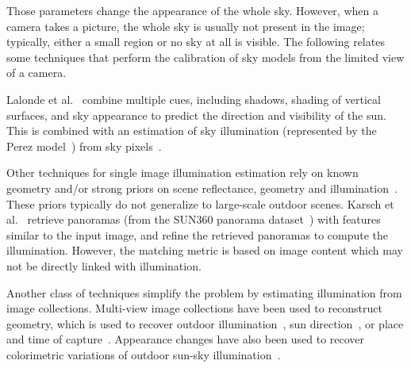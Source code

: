 Those parameters change the appearance of the whole sky. However, when a camera takes a picture, the whole sky is usually not present in the image; typically, either a small region or no sky at all is visible. The following relates some techniques that perform the calibration of sky models from the limited view of a camera. 

Lalonde et al.~\cite{lalonde-ijcv-12} combine multiple cues, including shadows, shading of vertical surfaces, and sky appearance to predict the direction and visibility of the sun. This is combined with an estimation of sky illumination (represented by the Perez model~\cite{perez1993allweather}) from sky pixels~\cite{lalonde-ijcv-10}. 

Other techniques for single image illumination estimation rely on known geometry and/or strong priors on scene reflectance, geometry and illumination~\cite{barron-pami-15,barron2013rgbd,lombardi2016reflectance}. These priors typically do not generalize to large-scale outdoor scenes. Karsch et al.~\cite{karsch2014automatic} retrieve panoramas (from the SUN360 panorama dataset~\cite{xiao-cvpr-12}) with features similar to the input image, and refine the retrieved panoramas to compute the illumination. However, the matching metric is based on image content which may not be directly linked with illumination. 

Another class of techniques simplify the problem by estimating illumination from image collections. Multi-view image collections have been used to reconstruct geometry, which is used to recover outdoor illumination~\cite{haber2009relighting,lalonde-3dv-14,shan2015visual,duchene2015multiview}, sun direction~\cite{wehrwein2015shadows}, or place and time of capture~\cite{hauagge2014outdoor}. Appearance changes have also been used to recover colorimetric variations of outdoor sun-sky illumination~\cite{sunkavalli2008color}. 





